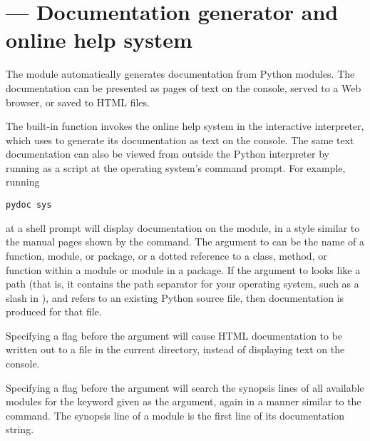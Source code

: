 \section{ ---
         Documentation generator and online help system}



The  module automatically generates documentation from
Python modules.  The documentation can be presented as pages of text
on the console, served to a Web browser, or saved to HTML files.

The built-in function  invokes the online help system
in the interactive interpreter, which uses  to generate
its documentation as text on the console.  The same text documentation
can also be viewed from outside the Python interpreter by running
 as a script at the operating system's command prompt.
For example, running

\begin{verbatim}
pydoc sys
\end{verbatim}

at a shell prompt will display documentation on the 
module, in a style similar to the manual pages shown by the \UNIX{}
 command.  The argument to  can be the name
of a function, module, or package, or a dotted reference to a class,
method, or function within a module or module in a package.  If the
argument to  looks like a path (that is, it contains the
path separator for your operating system, such as a slash in \UNIX),
and refers to an existing Python source file, then documentation is
produced for that file.

Specifying a  flag before the argument will cause HTML
documentation to be written out to a file in the current directory,
instead of displaying text on the console.

Specifying a  flag before the argument will search the
synopsis lines of all available modules for the keyword given as the
argument, again in a manner similar to the \UNIX{} 
command.  The synopsis line of a module is the first line of its
documentation string.

